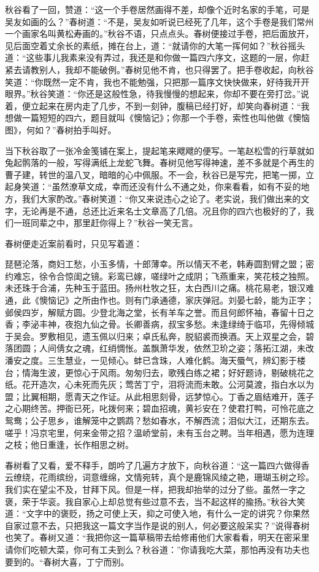 \documentclass[12pt,UTF8]{ctexbook}
\begin{document}
{{{秋谷看了一回，赞道：“这一个手卷居然画得不差，却像个近时名家的手笔，可是吴友如画的么？”春树道：“不是，吴友如听说已经死了几年，这个手卷是我们常州一个画家名叫黄松寿画的。”秋谷不语，只点点头。春树便接过手卷，把后面放开，见后面空着丈余长的素纸，摊在台上，道：“就请你的大笔一挥何如？”秋谷摇头道：“这些事儿我素来没有弄过，我还是和你做一篇四六序文，这题的一层，你赶紧去请教别人，我却不能破例。”春树见他不肯，也只得罢了。把手卷收起，向秋谷笑道：“你既然一定不肯，我也不能勉强，只把那一篇序文快快做来，好待我开开眼界。”秋谷笑道：“你还是这般性急，待我慢慢的想起来，你却不要在旁打岔。”说着，便立起来在房内走了几步，不到一刻钟，腹稿已经打好，却笑向春树道：“我想做一篇短短的四六，题目就叫《懊恼记》；你那一个手卷，索性也叫他做《懊恼图》，何如？”春树拍手叫好。

当下秋谷取了一张冷金笺铺在案上，提起笔来飕飕的便写。一笔赵松雪的行草就如兔起鹘落的一般，写得满纸上龙蛇飞舞。春树见他写得神速，差不多就是个再生的曹子建，转世的温八叉，暗暗的心中佩服。不一会，秋谷已是写完，把笔一掷，立起身笑道：“虽然潦草文成，幸而还没有什么不通之处，你来看看，如有不妥的地方，我们大家酌改。”春树笑道：“你又来说违心之论了。老实说，我们做出来的文字，无论再是不通，总还比近来名士文章高了几倍。况且你的四六也极好的了，我们一班同辈之中，那里赶你得上？”秋谷一笑无言。

春树便走近案前看时，只见写着道：

琵琶沦落，商妇工愁，小玉多情，十郎薄幸。所以情天不老，韩寿圆割臂之盟；密约难忘，徐令合惊闺之镜。彩鸾已嫁，嗟绿叶之成阴；飞燕重来，笑花枝之独照。未还珠于合浦，先种玉于蓝田。扬州杜牧之狂，太白西川之痛。桃花易老，银汉难通，此《懊恼记》之所由作也。则有门承通德，家庆弹冠。刘晏七龄，能为正字；邺侯四岁，解赋方圆。少登北海之堂，长有羊车之誉。而且何郎怀袖，春留十日之香；李泌丰神，夜抱九仙之骨。长卿善病，叔宝多愁。未逢绿绮于临邛，先得倾城于吴会。罗敷相见，遗玉佩以归来；卓氏私奔，脱貂裘而换酒。天上双星之会，碧落团圆；人间倩女之魂，红绡惆怅。盖飘萧华发，依然卫玠之姿；落拓江湖，未改潘安之度。三生慧业，一见倾心。蚌已含珠，人难化鹤。海天蜃气，辨幻影于楼台；情海生波，更惊心于风雨。匆匆归去，歌残白练之裙；好好题诗，剔破桃花之纸。花开造次，心未死而先灰；莺苦丁宁，泪将流而未敢。公河莫渡，指白水以为盟；比翼相期，愿青天之作证。从此相思刻骨，远梦惊心。丁香之眉结难开，莲子之心期终苦。押衙已死，叱拨何来；碧血招魂，黄衫安在？使君打鸭，可怜花底之鸳鸯；公子思乡，谁解笼中之鹦鹉？愁如春水，不解西流；泪似大江，还期东去。嗟乎！冯京宅里，何来金带之招？温峤堂前，未有玉台之聘。当年相遇，愿为连理之枝；他日重逢，长作相思之树。

春树看了又看，爱不释手，朗吟了几遍方才放下，向秋谷道：“这一篇四六做得香云缭绕，花雨缤纷，词意缠绵，文情宛转，真个是鹿锦风绫之艳，珊瑚玉树之珍。我们实在望尘不及，甘拜下风。但是一样，把我却抬举的过分了些。虽然一字之褒，荣于华衮。我自家心上却总觉有些过意不去，当不起这样的揄扬。”秋谷大笑道：“文字中的褒贬，扬之可使上天，抑之可使入地，有什么一定的讲究？你果然自家过意不去，只把我这一篇文字当作是说的别人，何必要这般呆实？”说得春树也笑了。春树又道：“我把你这一篇草稿带去给修甫他们大家看看，明天在密采里请你们吃顿大菜，你可有工夫到么？秋谷道：”你请我吃大菜，那怕再没有功夫也要到的。“春树大喜，丁宁而别。

}}}
\end{document}
